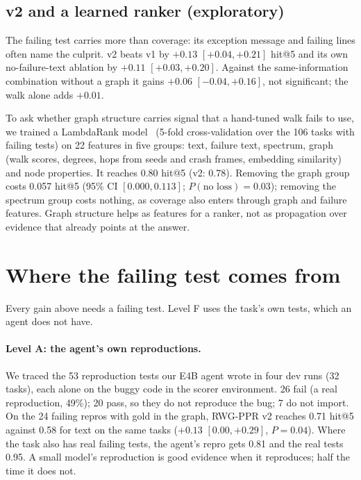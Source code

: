 \documentclass[10pt]{article}
\begin{document}
\subsection{v2 and a learned ranker (exploratory)}

The failing test carries more than coverage: its exception message and failing lines often name the culprit. v2 beats v1
by $+0.13$ $[+0.04, +0.21]$ hit@5 and its own no-failure-text ablation by $+0.11$ $[+0.03, +0.20]$. Against the
same-information combination without a graph it gains $+0.06$ $[-0.04, +0.16]$, not significant; the walk alone adds
$+0.01$.

To ask whether graph structure carries signal that a hand-tuned walk fails to use, we trained a LambdaRank
model~\cite{ke2017lightgbm} (5-fold cross-validation over the 106 tasks with failing tests) on 22 features in five
groups: text, failure text, spectrum, graph (walk scores, degrees, hops from seeds and crash frames, embedding
similarity) and node properties. It reaches 0.80 hit@5 (v2: 0.78). Removing the graph group costs 0.057 hit@5 (95\% CI
$[0.000, 0.113]$; $P(\text{no loss}) = 0.03$); removing the spectrum group costs nothing, as coverage also enters
through graph and failure features. Graph structure helps as features for a ranker, not as propagation over evidence
that already points at the answer.

\section{Where the failing test comes from}

Every gain above needs a failing test. Level F uses the task's own tests, which an agent does not have.

\paragraph{Level A: the agent's own reproductions.} We traced the 53 reproduction tests our E4B agent wrote in four dev
runs (32 tasks), each alone on the buggy code in the scorer environment. 26 fail (a real reproduction, 49\%); 20 pass,
so they do not reproduce the bug; 7 do not import. On the 24 failing repros with gold in the graph, RWG-PPR v2 reaches
0.71 hit@5 against 0.58 for text on the same tasks ($+0.13$ $[0.00, +0.29]$, $P = 0.04$). Where the task also has real
failing tests, the agent's repro gets 0.81 and the real tests 0.95. A small model's reproduction is good evidence when
it reproduces; half the time it does not.
\end{document}
